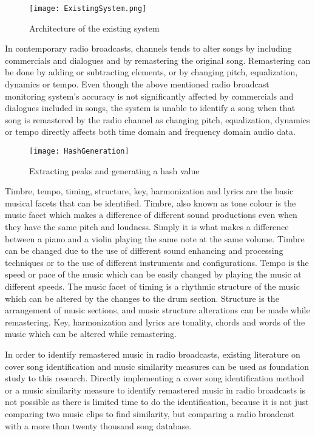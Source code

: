 \vspace{12pt}

\begin{figure}[H]
    \centering
    \texttt{[image: ExistingSystem.png]}
    \caption{Architecture of the existing system}
    \label{fig:existing_system}
\end{figure}
\vspace{12pt}

In contemporary radio broadcasts, channels tends to alter songs by including commercials and dialogues and by remastering 
the original song. Remastering can be done by adding or subtracting elements, or by changing pitch, equalization, dynamics or 
tempo\cite{SerraBook}. Even though the above mentioned radio broadcast monitoring system's accuracy is not significantly 
affected by commercials and dialogues included in songs, the system is unable to identify a song when that song is remastered 
by the radio channel as changing pitch, equalization, dynamics or tempo directly affects both time domain and 
frequency domain audio data.

\vspace{12pt}

\begin{figure}[H]
    \centering
    \texttt{[image: HashGeneration]}
    \caption{Extracting peaks and generating a hash value\cite{Nishan}}
    \label{fig:fingerprint}
\end{figure}

\vspace{12pt}

Timbre, tempo, timing, structure, key, harmonization and lyrics are the basic musical facets that can be 
identified\cite{SerraBook}. Timbre, also known as tone colour is the music facet which makes a difference of different 
sound productions even when they have the same pitch and loudness. Simply it is what makes a difference between a piano 
and a violin playing the same note at the same volume. Timbre can be changed due to the use of different sound enhancing 
and processing techniques or to the use of different instruments and configurations. Tempo is the speed or pace of the 
music which can be easily changed by playing the music at different speeds. The music facet of timing is a rhythmic structure 
of the music which can be altered by the changes to the drum section. Structure is the arrangement of music sections, and
music structure alterations can be made while remastering. Key, harmonization and lyrics are 
tonality, chords and words of the music which can be altered while remastering.
\vspace{12pt}

In order to identify remastered music in radio broadcasts,
existing literature on cover song identification and music similarity measures can be used as foundation study to this 
research. Directly implementing a cover song identification method or a music similarity measure to identify remastered 
music in radio broadcasts is not possible as there is limited time to do the identification, because it is not just 
comparing two music clips to find similarity, but comparing a radio broadcast with a more than twenty thousand song database.